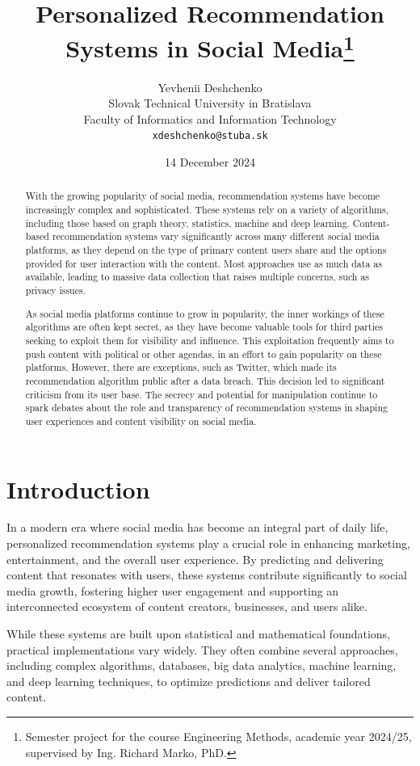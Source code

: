 \documentclass[10pt,twocolumn,twoside,a4paper]{article} %
\title{Personalized Recommendation Systems in Social Media\thanks{Semester project for the course Engineering Methods, academic year 2024/25, supervised by Ing. Richard Marko, PhD.}}
\author{Yevhenii Deshchenko\\[2pt]
	{\small Slovak Technical University in Bratislava}\\
	{\small Faculty of Informatics and Information Technology}\\
	{\small \texttt{xdeshchenko@stuba.sk}}
}
\date{\small 14 December 2024}
\begin{document}
\maketitle

\begin{abstract}
With the growing popularity of social media, recommendation systems have become increasingly complex and sophisticated. 
These systems rely on a variety of algorithms, including those based on graph theory, statistics, machine and deep learning. 
Content-based recommendation systems vary significantly across many different social media platforms, as they depend on the 
type of primary content users share and the options provided for user interaction with the content. 
Most approaches use as much data as available, leading to massive data collection that raises multiple concerns, such as privacy issues.


As social media platforms continue to grow in popularity, the inner workings of these algorithms are often kept secret,
as they have become valuable tools for third parties seeking to exploit them for visibility and influence.
This exploitation frequently aims to push content with political or other agendas, in an effort to gain popularity on these platforms.
However, there are exceptions, such as Twitter, which made its recommendation algorithm public after a data breach.
This decision led to significant criticism from its user base. The secrecy and potential for manipulation continue to
spark debates about the role and transparency of recommendation systems in shaping user experiences and content visibility on social media.
\end{abstract}


\section{Introduction} 

In a modern era where social media has become an integral part of daily life, personalized recommendation systems play a
crucial role in enhancing marketing, entertainment, and the overall user experience. By predicting and delivering content
that resonates with users, these systems contribute significantly to social media growth, fostering higher user engagement
and supporting an interconnected ecosystem of content creators, businesses, and users alike.

While these systems are built upon statistical and mathematical foundations, practical implementations vary widely.
They often combine several approaches, including complex algorithms, databases, big data analytics, machine learning,
and deep learning techniques, to optimize predictions and deliver tailored content. 
\end{document}
